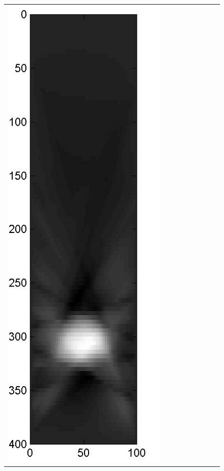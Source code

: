 \documentclass[11pt]{article}
\begin{document}
{\begin{figure}[!h]
\begin{center}
\begin{tabular}{|c|c|c|c|c|c|c|c|c|}
			\includegraphics[width=.9\iwidth]{figures/newFigs/noisy/resultsExp-7-mk}
			&

\end{tabular}
\end{center}
\end{figure}}
\end{document}
